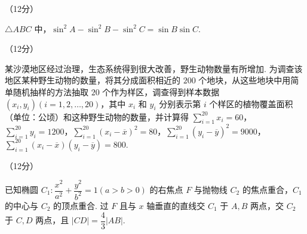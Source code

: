 \documentclass[a4paper,11pt]{report}
\begin{document}
\vspace{-0.6em}
\begin{examanswers}[start=17]

\vspace{-0.5em}
\item（12分）

$\triangle ABC$ 中，$\sin^2 A-\sin^2 B-\sin^2 C=\sin B\sin C$.


\vspace{-1em}
\item（12分）

某沙漠地区经过治理，生态系统得到很大改善，野生动物数量有所增加. 为调查该地区某种野生动物的数量，将其分成面积相近的 $200$ 个地块，从这些地块中用简单随机抽样的方法抽取 $20$ 个作为样区，调查得到样本数据 $(x_i,y_i)(i=1,2,\ldots,20)$，其中 $x_i$ 和 $y_i$ 分别表示第 $i$ 个样区的植物覆盖面积（单位：公顷）和这种野生动物的数量，并计算得 $\sum_{i=1}^{20}x_i=60$，$\sum_{i=1}^{20}y_i=1200$，$\sum_{i=1}^{20}(x_i-\overline{x})^2=80$，$\sum_{i=1}^{20}(y_i-\overline{y})^2=9000$，$\sum_{i=1}^{20}(x_i-\overline{x})(y_i-\overline{y})=800$.




\item（12分）

已知椭圆 $C_1:\dfrac{x^2}{a^2}+\dfrac{y^2}{b^2}=1(a>b>0)$ 的右焦点 $F$ 与抛物线 $C_2$ 的焦点重合，$C_1$ 的中心与 $C_2$ 的顶点重合. 过 $F$ 且与 $x$ 轴垂直的直线交 $C_1$ 于 $A,B$ 两点，交 $C_2$ 于 $C,D$ 两点，且 $|CD|=\dfrac43|AB|$.




\end{examanswers}
\end{document}
